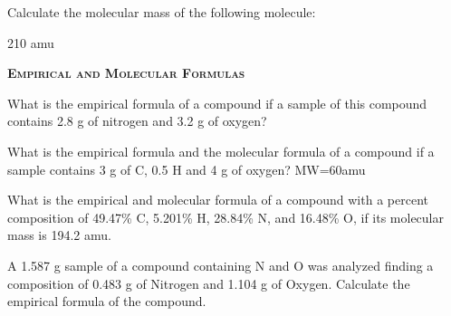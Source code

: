 \documentclass[main.tex]{subfiles}
\begin{document}
\begin{multicols*}{2}
\begin{question}[ID=19]
Calculate the molecular mass of the following molecule: 
\end{question}
\begin{solution}
210 amu
\hspace{0.1cm}\end{solution}

{\raggedright\textsc{\textbf{Empirical and Molecular Formulas }}\par} 






\begin{question}[ID=20]
What is the empirical formula of a compound if a sample of this compound contains 2.8 g of nitrogen and 3.2 g of oxygen?
\end{question}
\begin{solution}
\hspace{0.1cm}\end{solution}


\begin{question}[ID=21]
What is the empirical formula and the molecular formula of a compound if a sample contains 3 g of C, 0.5 H and 4 g of oxygen? MW=60amu
\end{question}
\begin{solution}
\hspace{0.1cm}\end{solution}



\begin{question}[ID=22]
What is the empirical and molecular formula of a compound with a percent composition of 49.47\% C, 5.201\% H, 28.84\% N, and 16.48\% O, if its molecular mass is 194.2 amu.
\end{question}
\begin{solution}
\hspace{0.1cm}\end{solution}

\begin{question}[ID=23]
A 1.587 g sample of a compound containing N and O was analyzed finding a composition of 0.483 g of Nitrogen and 1.104 g of Oxygen. Calculate the empirical formula of the compound.

\end{question}
\begin{solution}
\hspace{0.1cm}\end{solution}

\end{multicols*}
\end{document}
